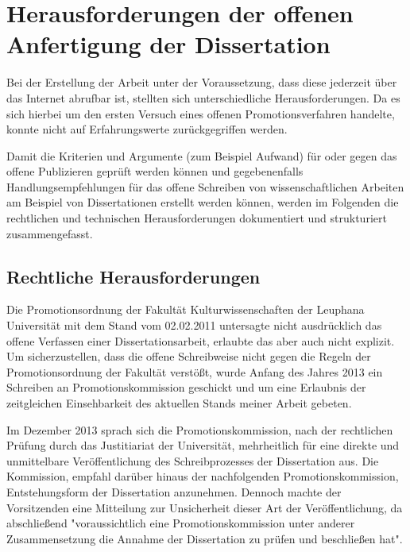 \section{Herausforderungen der offenen Anfertigung der Dissertation}

Bei der Erstellung der Arbeit unter der Voraussetzung, dass diese jederzeit über das Internet abrufbar ist, stellten sich unterschiedliche Herausforderungen. Da es sich hierbei um den ersten Versuch eines offenen Promotionsverfahren handelte, konnte nicht auf Erfahrungswerte zurückgegriffen werden.

Damit die Kriterien und Argumente (zum Beispiel Aufwand) für oder gegen das offene Publizieren geprüft werden können und gegebenenfalls Handlungsempfehlungen für das offene Schreiben von wissenschaftlichen Arbeiten am Beispiel von Dissertationen erstellt werden können, werden im Folgenden die rechtlichen und technischen Herausforderungen dokumentiert und strukturiert zusammengefasst.

\subsection{Rechtliche Herausforderungen}

Die Promotionsordnung der Fakultät Kulturwissenschaften der Leuphana Universität mit dem Stand vom 02.02.2011 untersagte nicht ausdrücklich das offene Verfassen einer Dissertationsarbeit, erlaubte das aber auch nicht explizit. Um sicherzustellen, dass die offene Schreibweise nicht gegen die Regeln der Promotionsordnung der Fakultät verstößt, wurde Anfang des Jahres 2013 ein Schreiben an Promotionskommission geschickt und um eine Erlaubnis der zeitgleichen Einsehbarkeit des aktuellen Stands meiner Arbeit gebeten.

Im Dezember 2013 sprach sich die Promotionskommission, nach der rechtlichen Prüfung durch das Justitiariat der Universität, mehrheitlich für eine direkte und unmittelbare Veröffentlichung des Schreibprozesses der Dissertation aus. Die Kommission, empfahl darüber hinaus der nachfolgenden Promotionskommission, Entstehungsform der Dissertation anzunehmen. Dennoch machte der Vorsitzenden eine Mitteilung zur Unsicherheit dieser Art der Veröffentlichung, da abschließend "voraussichtlich eine Promotionskommission unter anderer Zusammensetzung die Annahme der Dissertation zu prüfen und beschließen hat".

